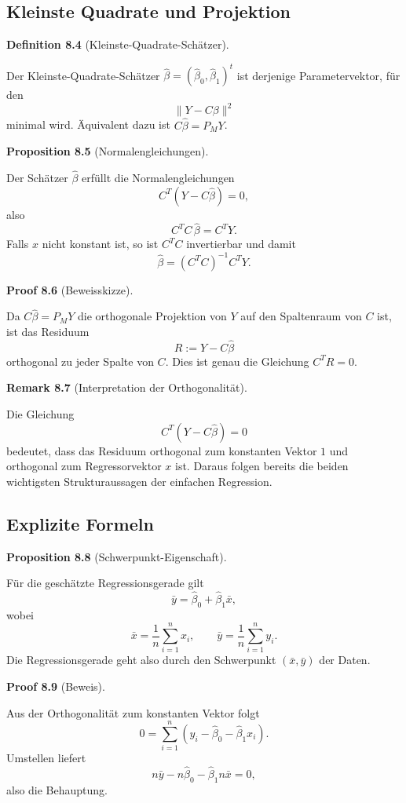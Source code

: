 \documentclass[10pt, letterpaper]{article}
\newcommand{\CustomHeading}[3]{%
  \par\medskip\noindent%
  \textbf{#1 #2} \textnormal{(#3)}.\enskip%
}
\newenvironment{DEF}[2]{\CustomHeading{Definition}{#1}{#2}}{}
\newenvironment{PROP}[2]{\CustomHeading{Proposition}{#1}{#2}}{}
\newenvironment{REM}[2]{\CustomHeading{Remark}{#1}{#2}}{}
\newenvironment{PROOF}[2]{\CustomHeading{Proof}{#1}{#2}}{}
\begin{document}
\subsection{Kleinste Quadrate und Projektion}

\begin{DEF}{8.4}{Kleinste-Quadrate-Schätzer}
Der Kleinste-Quadrate-Schätzer \(\hat\beta=(\hat\beta_0,\hat\beta_1)^t\) ist derjenige Parametervektor, für den
\[
\|Y-C\beta\|^2
\]
minimal wird. Äquivalent dazu ist \(C\hat\beta=P_M Y\).
\end{DEF}

\begin{PROP}{8.5}{Normalengleichungen}
Der Schätzer \(\hat\beta\) erfüllt die Normalengleichungen
\[
C^T(Y-C\hat\beta)=0,
\]
also
\[
C^TC\,\hat\beta=C^TY.
\]
Falls \(x\) nicht konstant ist, so ist \(C^TC\) invertierbar und damit
\[
\hat\beta=(C^TC)^{-1}C^TY.
\]
\end{PROP}

\begin{PROOF}{8.6}{Beweisskizze}
Da \(C\hat\beta=P_MY\) die orthogonale Projektion von \(Y\) auf den Spaltenraum von \(C\) ist, ist das Residuum
\[
R:=Y-C\hat\beta
\]
orthogonal zu jeder Spalte von \(C\). Dies ist genau die Gleichung \(C^TR=0\).
\end{PROOF}

\begin{REM}{8.7}{Interpretation der Orthogonalität}
Die Gleichung
\[
C^T(Y-C\hat\beta)=0
\]
bedeutet, dass das Residuum orthogonal zum konstanten Vektor \(1\) und orthogonal zum Regressorvektor \(x\) ist. Daraus folgen bereits die beiden wichtigsten Strukturaussagen der einfachen Regression.
\end{REM}

\subsection{Explizite Formeln}

\begin{PROP}{8.8}{Schwerpunkt-Eigenschaft}
Für die geschätzte Regressionsgerade gilt
\[
\bar y=\hat\beta_0+\hat\beta_1\bar x,
\]
wobei
\[
\bar x=\frac1n\sum_{i=1}^n x_i,
\qquad
\bar y=\frac1n\sum_{i=1}^n y_i.
\]
Die Regressionsgerade geht also durch den Schwerpunkt \((\bar x,\bar y)\) der Daten.
\end{PROP}

\begin{PROOF}{8.9}{Beweis}
Aus der Orthogonalität zum konstanten Vektor folgt
\[
0=\sum_{i=1}^n (y_i-\hat\beta_0-\hat\beta_1x_i).
\]
Umstellen liefert
\[
n\bar y-n\hat\beta_0-\hat\beta_1 n\bar x=0,
\]
also die Behauptung.
\end{PROOF}
\end{document}
